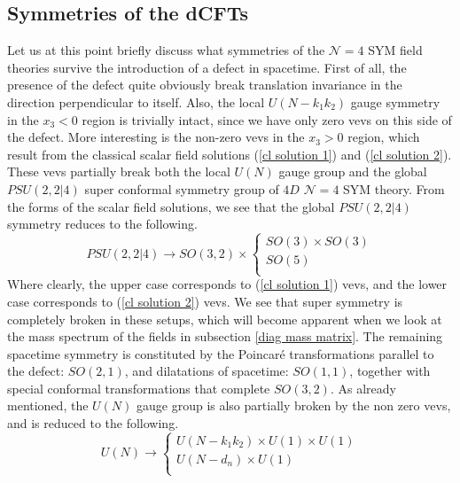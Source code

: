 \subsection{Symmetries of the dCFTs}
Let us at this point briefly discuss what symmetries of the $\mathcal{N}=4$ SYM field theories survive the introduction of a defect in spacetime. First of all, the presence of the defect quite obviously break translation invariance in the direction perpendicular to itself. Also, the local $U(N - k_1 k_2)$ gauge symmetry in the $x_3 < 0$ region is trivially intact, since we have only zero vevs on this side of the defect. More interesting is the non-zero vevs in the $x_3 > 0$ region, which result from the classical scalar field solutions (\ref{cl solution 1}) and (\ref{cl solution 2}). These vevs partially break both the local $U(N)$ gauge group and the global $PSU(2,2|4)$ super conformal symmetry group of $4D$ $\mathcal{N} = 4$ SYM theory. From the forms of the scalar field solutions, we see that the global $PSU(2,2|4)$ symmetry reduces to the following.
%
%
\begin{equation}
PSU(2,2|4) \to SO(3,2) \times
\begin{cases}
	SO(3) \times SO(3) \\
	SO(5) \\
\end{cases}
\end{equation}
%
%
Where clearly, the upper case corresponds to (\ref{cl solution 1}) vevs, and the lower case corresponds to (\ref{cl solution 2}) vevs. We see that super symmetry is completely broken in these setups, which will become apparent when we look at the mass spectrum of the fields in subsection \ref{diag mass matrix}. The remaining spacetime symmetry is constituted by the Poincar\'e transformations parallel to the defect: $SO(2,1)$, and dilatations of spacetime: $SO(1,1)$, together with special conformal transformations that complete $SO(3,2)$. As already mentioned, the $U(N)$ gauge group is also partially broken by the non zero vevs, and is reduced to the following.
%
%
\begin{equation}
U(N) \to
\begin{cases}
	U(N - k_1 k_2) \times U(1) \times U(1) \\
	U(N - d_n) \times U(1) \\
\end{cases}
\end{equation}
%
%
